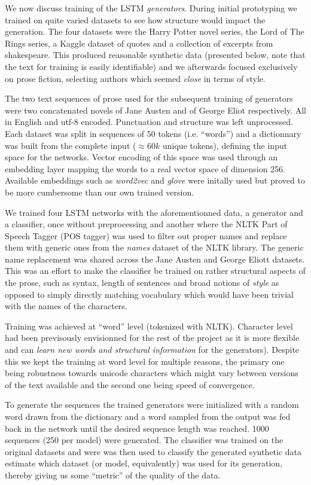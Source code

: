 We now discuss training of the LSTM \textit{generators}. During initial
prototyping we trained on quite varied datasets to see how structure would
impact the generation. The four datasets were the Harry Potter novel series,
the Lord of The Rings series, a Kaggle dataset of quotes and a collection of
excerpts from shakespeare. This produced reasonable synthetic data (presented
below, note that the text for training is easily identifiable) and we
afterwards focused exclusively on prose fiction, selecting authors which seemed
\textit{close} in terms of style.  

The two text sequences of prose used for the subsequent training of generators
were two concatenated novels of Jane Austen and of George Eliot respectively.
All in English and utf-8 encoded.  Punctuation and structure was left
unprocessed.  Each dataset was split in sequences of 50 tokens (i.e.
``words'') and a dictionnary was built from the complete input ($\approx 60k$
unique tokens), defining the input space for the networks.  Vector encoding of
this space was used through an embedding layer mapping the words to a real
vector space of dimension 256.  Available embeddings such as \textit{word2vec}
and \textit{glove} were initally used but proved to be more cumbersome than our
own trained version. 

We trained four LSTM networks with the aforementionned data, a generator and a
classifier, once without preprocessing and another where the NLTK Part of
Speech Tagger (POS tagger) was used to filter out proper names and replace them
with generic ones from the \textit{names} dataset of the NLTK library. The
generic name replacement was shared across the Jane Austen and George Eliott
datasets. This was an effort to make the classifier be trained on rather
structural aspects of the prose, such as syntax, length of sentences and broad
notions of \textit{style} as opposed to simply directly matching vocabulary
which would have been trivial with the names of the characters.

Training was achieved at ``word'' level (tokenized with NLTK).
Character level had been previsously envisionned for the rest of the project as
it is more flexible and can \textit{learn new words and structural
information}\cite{gravesGenerating} for the generators). Despite this we kept
the training at word level for multiple reasons, the primary one being
robustness towards unicode characters which might vary between versions of the
text available and the second one being speed of convergence. 

To generate the sequences the trained generators were initialized with a random
word drawn from the dictionary and a word sampled from the output was fed back in
the network until the desired sequence length was reached. 1000 sequences (250
per model) were generated.  The classifier was trained on the original datasets
and were was then used to classify the generated synthetic data estimate which
dataset (or model, equivalently) was used for its generation, thereby giving us
some ``metric'' of the quality of the data.

